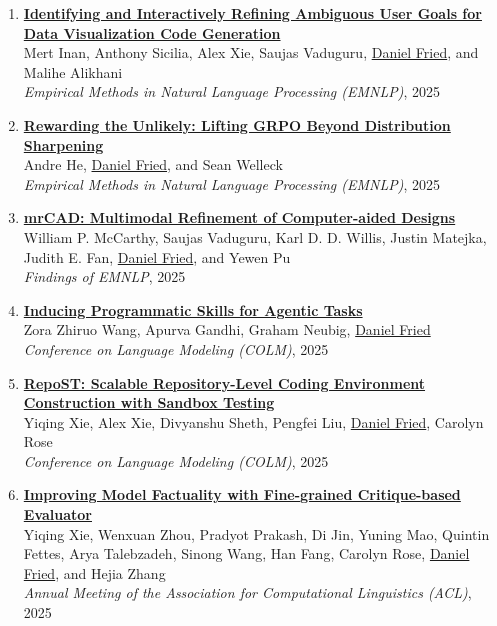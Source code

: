 \begin{enumerate}[leftmargin=-1mm,partopsep=0pt]
\item \href{https://arxiv.org/abs/2510.09390}{\textbf{Identifying and Interactively Refining Ambiguous User Goals for Data Visualization Code Generation}} \\
  Mert Inan, Anthony Sicilia, Alex Xie, Saujas Vaduguru, \underline{Daniel Fried}, and Malihe Alikhani\\
  \emph{Empirical Methods in Natural Language Processing (EMNLP)}, 2025

\item \href{https://arxiv.org/abs/2506.02355}{\textbf{Rewarding the Unlikely: Lifting GRPO Beyond Distribution Sharpening}} \\
  Andre He, \underline{Daniel Fried}, and Sean Welleck\\
  \emph{Empirical Methods in Natural Language Processing (EMNLP)}, 2025

\item \href{https://arxiv.org/abs/2504.20294}{\textbf{mrCAD: Multimodal Refinement of Computer-aided Designs}} \\
  William P. McCarthy, Saujas Vaduguru, Karl D. D. Willis, Justin Matejka, Judith E. Fan, \underline{Daniel Fried}, and Yewen Pu\\
  \emph{Findings of EMNLP}, 2025

\item \href{https://arxiv.org/abs/2504.06821}{\textbf{Inducing Programmatic Skills for Agentic Tasks}} \\
  Zora Zhiruo Wang, Apurva Gandhi, Graham Neubig, \underline{Daniel Fried}\\
  \emph{Conference on Language Modeling (COLM)}, 2025

\item \href{https://arxiv.org/abs/2503.07358}{\textbf{RepoST: Scalable Repository-Level Coding Environment Construction with Sandbox Testing}} \\
  Yiqing Xie, Alex Xie, Divyanshu Sheth, Pengfei Liu, \underline{Daniel Fried}, Carolyn Rose\\
  \emph{Conference on Language Modeling (COLM)}, 2025

\item \href{https://arxiv.org/abs/2410.18359}{\textbf{Improving Model Factuality with Fine-grained Critique-based Evaluator}} \\
  Yiqing Xie, Wenxuan Zhou, Pradyot Prakash, Di Jin, Yuning Mao, Quintin Fettes, Arya Talebzadeh, Sinong Wang, Han Fang, Carolyn Rose, \underline{Daniel Fried}, and Hejia Zhang\\
  \emph{Annual Meeting of the Association for Computational Linguistics (ACL)}, 2025


\end{enumerate}
